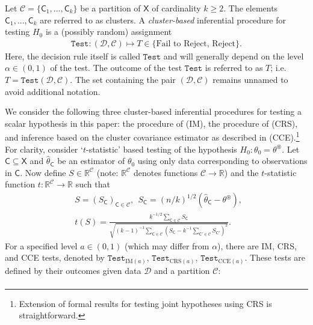 \documentclass[preprint]{imsart}
\numberwithin{equation}{section}
\theoremstyle{plain}
\theoremstyle{definition}
\renewcommand{\(}{\left(}
\renewcommand{\)}{\right)}
\renewcommand{\[}{\left[}
\renewcommand{\]}{\right]}
\renewcommand{\hat}{\widehat}
\newcommand{\G}{k}
\newcommand{\Test}{\mathtt{Test}}
\renewcommand{\hat}{\widehat}
\renewcommand{\geq}{\geqslant}
\begin{document}
{Let $\mathcal C = \{ \mathsf C_1,...,\mathsf C_\G \}$ be a partition of $\mathsf X$ of cardinality $\G \geq 2$.  The elements $\mathsf C_1,...,\mathsf C_\G$ are referred to as clusters.  A \textit{cluster-based} inferential procedure for testing $H_0$ is a (possibly random) assignment 
\begin{align} \mathtt{Test}: (\mathscr D, \mathcal C) \mapsto T \in \big \{\text{Fail to Reject, Reject} \big \}. 
\end{align}
Here, the decision rule itself is called $\mathtt{Test}$ and will generally depend on the level $\alpha \in (0,1)$ of the test.  The outcome of the test $\Test$ is referred to as $T$; i.e. $T = \Test(\mathscr D, \mathcal C)$.  The set containing the pair $(\mathscr D, \mathcal C)$ remains unnamed to avoid additional notation.


We consider the following three cluster-based inferential procedures for testing a scalar hypothesis in this paper: the procedure of \cite{Ibragimov2010} (IM), the procedure of \cite{Canay2017} (CRS), and inference based on the cluster covariance estimator as described in \cite{BCH-inference} (CCE).\footnote{Extension of formal results for testing joint hypotheses using CRS is straightforward.} For clarity, consider `$t$-statistic' based testing of the hypothesis $H_0: \theta_0 = \theta^\circledast$. Let $\mathsf C\subseteq \mathsf X$ and $\hat \theta_{\mathsf C}$ be an estimator of $\theta_0$ using only data corresponding to observations in $\mathsf C$. Now define $S \in \mathbb R^{\mathcal C}$ (note: $\mathbb R^{\mathcal C}$ denotes functions $\mathcal C \rightarrow \mathbb R$) and the $t$-statistic function $t:\mathbb{R}^{\mathcal C}\rightarrow \mathbb{R}$ such that 
\begin{align}
&S = (S_\mathsf C)_{\mathsf C \in \mathcal C}, \ \ S_{\mathsf C} = (n/\G)^{1/2} (\hat \theta_{\mathsf C} - \theta^\circledast), \phantom{\Bigg |}\\ &t(S)=\frac{ \G^{-1/2}\sum_{\mathsf C \in \mathcal C} S_{\mathsf C}}{\sqrt{(\G-1)^{-1}\sum_{\mathsf C \in \mathcal C} \left (S_{\mathsf C}-\G^{-1}\sum_{\mathsf C' \in \mathcal C} S_{\mathsf C'}\right )^2}}.
\end{align} 
For a specified level $a\in(0,1)$ (which may differ from $\alpha$), there are IM, CRS, and CCE tests, denoted by $\mathtt{Test}_{\text{IM}(a)}$, $\mathtt{Test}_{\text{CRS}(a)}$, $\mathtt{Test}_{\text{CCE}(a)}$.  These tests are defined by their outcomes given data $\mathscr D$ and a partition $\mathcal C$:
\begin{align} 

\end{align}}
\end{document}
